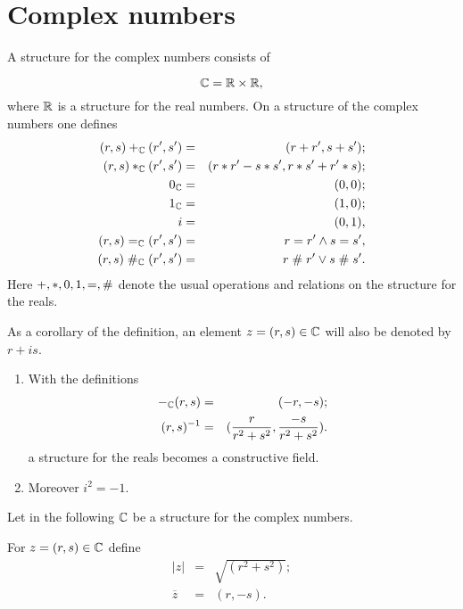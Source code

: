 \section{Complex numbers}
\begin{definition}
A structure for the complex numbers consists of

$$\mathbb{C}=\mathbb{R}\times \mathbb{R},$$
%
where $\mathbb{R}$ is a structure for the real numbers.
On a structure of the complex numbers one defines
\begin{eqnarray*}
(r,s)+_{\mathbb{C}}(r',s')&=&(r+r',s+s');\\
(r,s)*_{\mathbb{C}}(r',s')&=&(r*r'-s*s',r*s'+r'*s);\\
0_{\mathbb{C}}&=&(0,0);\\
1_{\mathbb{C}}&=&(1,0);\\
i&=&(0,1),\\
(r,s)=_{\mathbb{C}}(r',s')&=&r= r' \wedge s= s',\\
(r,s)\mathrel{\#}_{\mathbb{C}}(r',s')&=&r\mathrel{\#} r' \vee s\mathrel{\#} s'.
\end{eqnarray*}
Here $+,*,0,1,=,\mathrel{\#}$ denote the usual operations and relations on
the structure for the reals.
\end{definition}

\begin{notation}
 As a corollary of the definition, an element $z=(r,s)\in \mathbb{C}$ will
 also be denoted by $r + is$.
\end{notation}

\begin{proposition}
\begin{enumerate}
\item With the definitions
\begin{eqnarray*}
-_{\mathbb{C}}(r,s)&=&(-r,-s);\\
(r,s)^{-1}&=&(\frac{r}{r^2+s^2},\frac{-s}{r^2+s^2}).
\end{eqnarray*}
a structure for the reals becomes a constructive field.
\item
Moreover $i^2=-1$.
\end{enumerate}
\end{proposition}

Let in the following $\mathbb{C}$ be a structure for the complex numbers.

\begin{definition}
For $z=(r,s)\in \mathbb{C}$ define
\begin{eqnarray*}
|z|&=&\sqrt{(r^2+s^2)};\\
\overline{z}&=&(r,-s).
\end{eqnarray*}
\end{definition}

